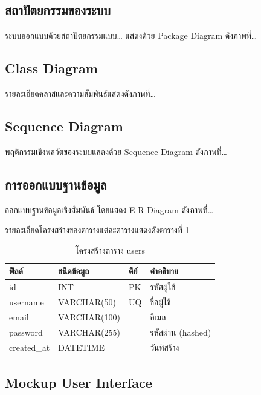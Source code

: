 \subsection{สถาปัตยกรรมของระบบ}

ระบบออกแบบด้วยสถาปัตยกรรมแบบ\ldots{} แสดงด้วย Package Diagram ดังภาพที่\ldots{}

\subsection{Class Diagram}

รายละเอียดคลาสและความสัมพันธ์แสดงดังภาพที่\ldots{}

\subsection{Sequence Diagram}

พฤติกรรมเชิงพลวัตของระบบแสดงด้วย Sequence Diagram ดังภาพที่\ldots{}

\subsection{การออกแบบฐานข้อมูล}

ออกแบบฐานข้อมูลเชิงสัมพันธ์ โดยแสดง E-R Diagram ดังภาพที่\ldots{}

รายละเอียดโครงสร้างของตารางแต่ละตารางแสดงดังตารางที่ \ref{tab:db_users}

\begin{table}[H]
\centering
\caption{โครงสร้างตาราง users}
\label{tab:db_users}
\begin{tabular}{|l|l|l|l|}
\hline
\textbf{ฟิลด์} & \textbf{ชนิดข้อมูล} & \textbf{คีย์} & \textbf{คำอธิบาย} \\
\hline
id & INT & PK & รหัสผู้ใช้ \\ \hline
username & VARCHAR(50) & UQ & ชื่อผู้ใช้ \\ \hline
email & VARCHAR(100) & & อีเมล \\ \hline
password & VARCHAR(255) & & รหัสผ่าน (hashed) \\ \hline
created\_at & DATETIME & & วันที่สร้าง \\
\hline
\end{tabular}
\end{table}

\subsection{Mockup User Interface}

